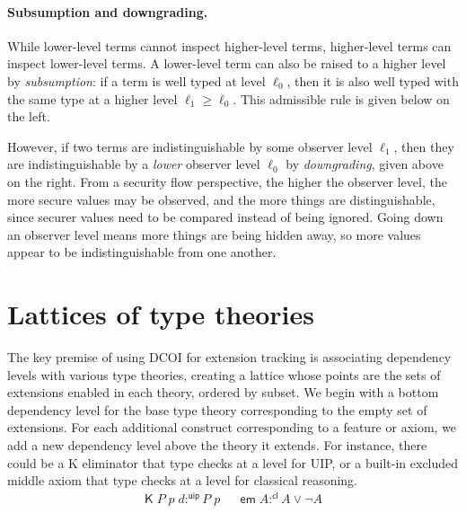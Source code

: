 \documentclass{article}
\newcommand{\kw}[1]{\mathsf{#1}}
\begin{document}
\paragraph{Subsumption and downgrading.}
While lower-level terms cannot inspect higher-level terms,
higher-level terms can inspect lower-level terms.
A lower-level term can also be raised to a higher level by \emph{subsumption}:
if a term is well typed at level $\ell_0$,
then it is also well typed with the same type at a higher level $\ell_1 \ge \ell_0$.
This admissible rule is given below on the left.
%
%
However, if two terms are indistinguishable by some observer level $\ell_1$,
then they are indistinguishable by a \emph{lower} observer level $\ell_0$ by \emph{downgrading},
given above on the right.
From a security flow perspective, the higher the observer level,
the more secure values may be observed,
and the more things are distinguishable,
since securer values need to be compared instead of being ignored.
Going down an observer level means more things are being hidden away,
so more values appear to be indistinguishable from one another.

\section{Lattices of type theories} \label{sec:lattice}

The key premise of using DCOI for extension tracking
is associating dependency levels with various type theories,
creating a lattice whose points are the sets of extensions
enabled in each theory, ordered by subset.
We begin with a bottom dependency level for the base type theory
corresponding to the empty set of extensions.
For each additional construct corresponding to a feature or axiom,
we add a new dependency level above the theory it extends.
For instance, there could be a K eliminator that type checks at a level for UIP,
or a built-in excluded middle axiom that type checks at a level for classical reasoning.
%
\begin{align*}
  \kw{K} \; P \; p \; d :^{\kw{uip}} P \; p &&
  \kw{em} \; A :^{\kw{cl}} A \vee \neg A
\end{align*}
\vspace{-1.5\baselineskip}
\end{document}
